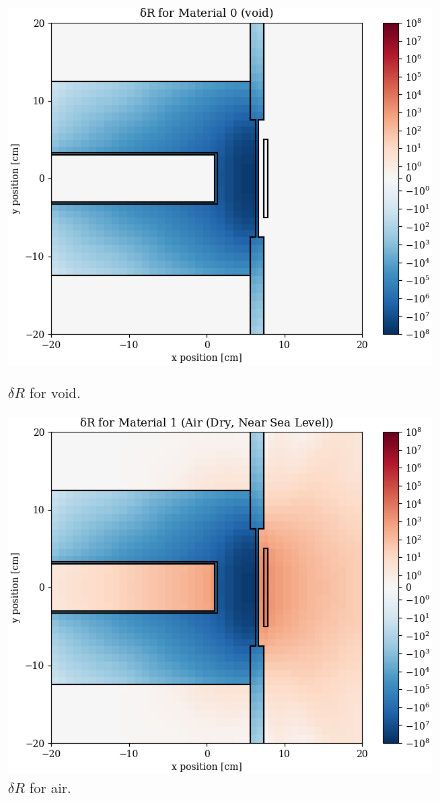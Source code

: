 \begin{figure}
  \begin{minipage}{0.49\linewidth}
    \centering
    \includegraphics[width=\linewidth]{content/testprob/dR_00.png}
    \caption{$\delta R$ for void.}
    \label{fig:testprob:dR_00}
  \end{minipage}
  \hfill
  \begin{minipage}{0.49\linewidth}
    \centering
    \includegraphics[width=\linewidth]{content/testprob/dR_01.png}
    \caption{$\delta R$ for air.}
    \label{fig:testprob:dR_01}
  \end{minipage}
\end{figure}

